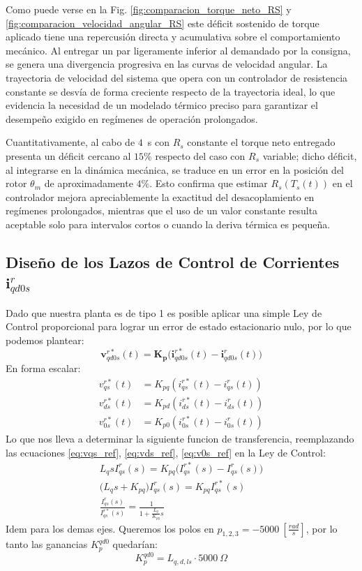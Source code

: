 \documentclass[12pt, a4paper,journal, onecolumn, compsoc]{IEEEtran}
\begin{document}
Como puede verse en la Fig. \ref{fig:comparacion_torque_neto_RS} y \ref{fig:comparacion_velocidad_angular_RS} este déficit sostenido de torque aplicado tiene una repercusión directa y acumulativa sobre el comportamiento mecánico. Al entregar un par ligeramente inferior al demandado por la consigna, se genera una divergencia progresiva en las curvas de velocidad angular. La trayectoria de velocidad del sistema que opera con un controlador de resistencia constante se desvía de forma creciente respecto de la trayectoria ideal, lo que evidencia la necesidad de un modelado térmico preciso para garantizar el desempeño exigido en regímenes de operación prolongados.

Cuantitativamente, al cabo de $4$~s con $R_s$ constante el torque neto entregado presenta un déficit cercano al $15\%$ respecto del caso con $R_s$ variable; dicho déficit, al integrarse en la dinámica mecánica, se traduce en un error en la posición del rotor $\theta_m$ de aproximadamente $4\%$. Esto confirma que estimar $R_s(T_s(t))$ en el controlador mejora apreciablemente la exactitud del desacoplamiento en regímenes prolongados, mientras que el uso de un valor constante resulta aceptable solo para intervalos cortos o cuando la deriva térmica es pequeña.
\subsection{Diseño de los Lazos de Control de Corrientes $\bm{i}_{qd0s}^r$}
Dado que nuestra planta es de tipo 1 es posible aplicar una simple Ley de Control proporcional para lograr un error de estado estacionario nulo, por lo que podemos plantear:
\begin{equation}
    \bm{v}_{qd0s}^{r*}(t) = \bm{K_p} \big(\bm{i}_{qd0s}^{r*}(t)-\bm{i}_{qd0s}^{r}(t)\big)
\end{equation}
En forma escalar:
\begin{equation*}
\begin{aligned}
v_{qs}^{r*}(t) &= K_{pq} \left(i_{qs}^{r*}(t) - i_{qs}^{r}(t)\right) \\
v_{ds}^{r*}(t) &= K_{pd} \left(i_{ds}^{r*}(t) - i_{ds}^{r}(t)\right) \\
v_{0s}^{r*}(t) &= K_{p0} \left(i_{0s}^{r*}(t) - i_{0s}^{r}(t)\right)
\end{aligned}
\end{equation*}
Lo que nos lleva a determinar la siguiente funcion de transferencia, reemplazando las ecuaciones \eqref{eq:vqs_ref}, \eqref{eq:vds_ref}, \eqref{eq:v0s_ref} en la Ley de Control:
\begin{gather*}
    L_qsI_{qs}^r(s) = K_{pq}\big(I_{qs}^{r*}(s)-I_{qs}^{r}(s)\big) \\ 
    \Big(L_qs+K_{pq}\Big)I_{qs}^r(s)=K_{pq}I_{qs}^{r*}(s) \\
    \frac{I_{qs}^r(s)}{I_{qs}^{r*}(s)} = \frac{1}{1+\frac{L_q}{K_{pq}}s}
\end{gather*}
Idem para los demas ejes.
Queremos los polos en $p_{1,2,3} = -5000 \ [\frac{rad}{s}]$, por lo tanto las ganancias $K_{p}^{qd0}$ quedarían: \[K_{p}^{qd0}=L_{q,d,ls}\cdot 5000 \ \Omega\]
\end{document}
